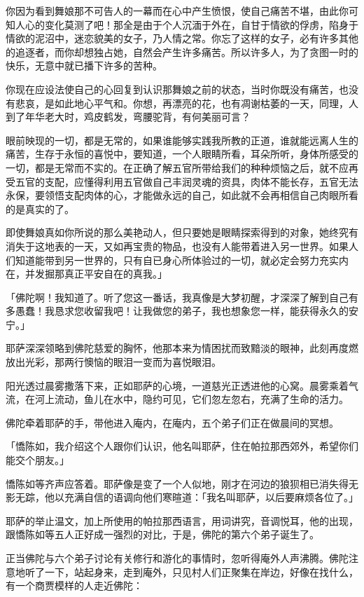 \documentclass[12pt,twoside,openany]{book}
\begin{document}
你因为看到舞娘那不可告人的一幕而在心中产生愤恨，使自己痛苦不堪，由此你可知人心的变化莫测了吧！那全是由于个人沉湎于外在，自甘于情欲的俘虏，陷身于情欲的泥沼中，迷恋貌美的女子，乃人情之常。你忘了这样的女子，必有许多其他的追逐者，而你却想独占她，自然会产生许多痛苦。所以许多人，为了贪图一时的快乐，无意中就已播下许多的苦种。

你现在应设法使自己的心回复到认识那舞娘之前的状态，当时你既没有痛苦，也没有悲哀，是如此地心平气和。你想，再漂亮的花，也有凋谢枯萎的一天，同理，人到了年华老大时，鸡皮鹤发，弯腰驼背，有何美丽可言？

眼前映现的一切，都是无常的，如果谁能够实践我所教的正道，谁就能远离人生的痛苦，生存于永恒的喜悦中，要知道，一个人眼睛所看，耳朵所听，身体所感受的一切，都是无常而不实的。在正确了解五官所带给我们的种种烦恼之后，就不应再受五官的支配，应懂得利用五官做自己丰润灵魂的资具，肉体不能长存，五官无法永保，要领悟支配肉体的心，才能做永远的自己，如此就不会再相信自己肉眼所看的是真实的了。

即使舞娘真如你所说的那么美艳动人，但只要她是眼睛探索得到的对象，她终究有消失于这地表的一天，又如再宝贵的物品，也没有人能带着进入另一世界。如果人们知道能带到另一世界的，只有自已身心所体验过的一切，就必定会努力充实内在，并发掘那真正平安自在的真我。」

「佛陀啊！我知道了。听了您这一番话，我真像是大梦初醒，才深深了解到自己有多愚蠢！我恳求您收留我吧！让我做您的弟子，我也想象您一样，能获得永久的安宁。」

耶萨深深领略到佛陀慈爱的胸怀，他那本来为情困扰而致黯淡的眼神，此刻再度燃放出光彩，那两行懊恼的眼泪一变而为喜悦眼泪。

阳光透过晨雾撒落下来，正如耶萨的心境，一道慈光正透进他的心窝。晨雾乘着气流，在河上流动，鱼儿在水中，隐约可见，它们忽左忽右，充满了生命的活力。

佛陀牵着耶萨的手，带他进入庵内，在庵内，五个弟子们正在做晨间的冥想。

「憍陈如，我介绍这个人跟你们认识，他名叫耶萨，住在帕拉那西郊外，希望你们能交个朋友。」

憍陈如等齐声应答着。耶萨像是变了一个人似地，刚才在河边的狼狈相已消失得无影无踪，他以充满自信的语调向他们寒暄道：「我名叫耶萨，以后要麻烦各位了。」

耶萨的举止温文，加上所使用的帕拉那西语言，用词讲究，音调悦耳，他的出现，跟憍陈如等五人正好成一强烈的对比，于是，佛陀的第六个弟子诞生了。

正当佛陀与六个弟子讨论有关修行和游化的事情时，忽听得庵外人声沸腾。佛陀注意地听了一下，站起身来，走到庵外，只见村人们正聚集在岸边，好像在找什么，有一个商贾模样的人走近佛陀：
\end{document}
